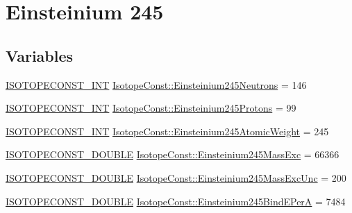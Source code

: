 \hypertarget{group___isotope_const-_einsteinium-_es245}{}\section{Einsteinium 245}
\label{group___isotope_const-_einsteinium-_es245}
\subsection*{Variables}
\begin{DoxyCompactItemize}
\item 
\mbox{\hyperlink{group___isotope_const-_macros_ga5f18360b3e99483a35c32d789e62621c}{I\+S\+O\+T\+O\+P\+E\+C\+O\+N\+S\+T\+\_\+\+I\+NT}} \mbox{\hyperlink{group___isotope_const-_einsteinium-_es245_ga57cb3388dbe4ba2abbd0a720b427471f}{Isotope\+Const\+::\+Einsteinium245\+Neutrons}} = 146
\item 
\mbox{\hyperlink{group___isotope_const-_macros_ga5f18360b3e99483a35c32d789e62621c}{I\+S\+O\+T\+O\+P\+E\+C\+O\+N\+S\+T\+\_\+\+I\+NT}} \mbox{\hyperlink{group___isotope_const-_einsteinium-_es245_ga34cbb7b595abc67af74f50b395d252c6}{Isotope\+Const\+::\+Einsteinium245\+Protons}} = 99
\item 
\mbox{\hyperlink{group___isotope_const-_macros_ga5f18360b3e99483a35c32d789e62621c}{I\+S\+O\+T\+O\+P\+E\+C\+O\+N\+S\+T\+\_\+\+I\+NT}} \mbox{\hyperlink{group___isotope_const-_einsteinium-_es245_ga2a012047022806a1d77b80a2be09586e}{Isotope\+Const\+::\+Einsteinium245\+Atomic\+Weight}} = 245
\item 
\mbox{\hyperlink{group___isotope_const-_macros_ga8f45a7272ce02c0b4c65c44636ed719a}{I\+S\+O\+T\+O\+P\+E\+C\+O\+N\+S\+T\+\_\+\+D\+O\+U\+B\+LE}} \mbox{\hyperlink{group___isotope_const-_einsteinium-_es245_ga3aff6b0aadb1e0ab45c20cddd40601df}{Isotope\+Const\+::\+Einsteinium245\+Mass\+Exc}} = 66366
\item 
\mbox{\hyperlink{group___isotope_const-_macros_ga8f45a7272ce02c0b4c65c44636ed719a}{I\+S\+O\+T\+O\+P\+E\+C\+O\+N\+S\+T\+\_\+\+D\+O\+U\+B\+LE}} \mbox{\hyperlink{group___isotope_const-_einsteinium-_es245_ga54861acc78945a7e8504f09bc0f92c77}{Isotope\+Const\+::\+Einsteinium245\+Mass\+Exc\+Unc}} = 200
\item 
\mbox{\hyperlink{group___isotope_const-_macros_ga8f45a7272ce02c0b4c65c44636ed719a}{I\+S\+O\+T\+O\+P\+E\+C\+O\+N\+S\+T\+\_\+\+D\+O\+U\+B\+LE}} \mbox{\hyperlink{group___isotope_const-_einsteinium-_es245_ga59b94d572c2e612d8d97de285422a7a6}{Isotope\+Const\+::\+Einsteinium245\+Bind\+E\+PerA}} = 7484
\item 

\end{DoxyCompactItemize}
